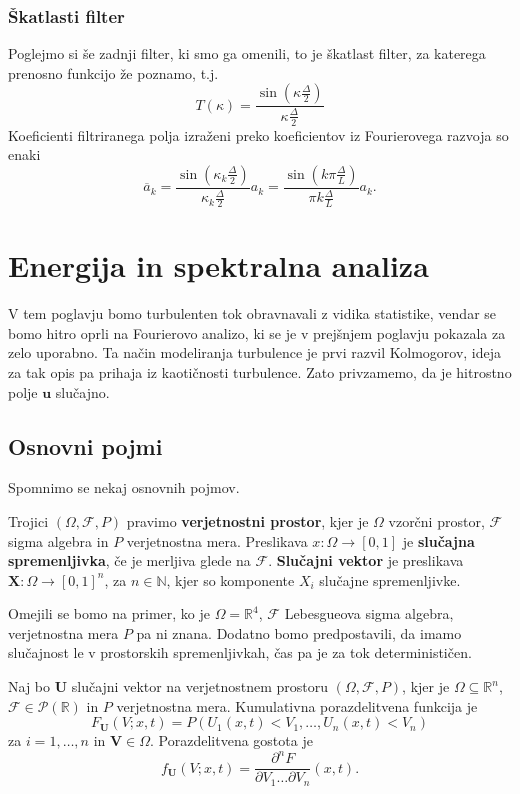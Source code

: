 \documentclass[mat2, tisk]{fmfdelo}
\newcommand{\R}{\mathbb R}
\newcommand{\N}{\mathbb N}
\newcommand{\bd}{\textbf}
\begin{document}
\subsubsection{Škatlasti filter}
Poglejmo si še zadnji filter, ki smo ga omenili, to je 
škatlast filter, za katerega prenosno funkcijo že poznamo, t.j.
$$
T(\kappa) = \frac{\sin(\kappa \frac{\Delta}{2})}{\kappa \frac{\Delta}{2}}
$$
Koeficienti filtriranega polja izraženi preko koeficientov iz Fourierovega razvoja so enaki
$$
\overline{a}_k = \frac{\sin(\kappa_k \frac{\Delta}{2})}{\kappa_k \frac{\Delta}{2}} a_k = \frac{\sin(k\pi\frac{\Delta}{L})}{\pi k\frac{\Delta}{L}} a_k .
$$


\section{Energija in spektralna analiza}

V tem poglavju bomo turbulenten tok obravnavali z vidika statistike, 
vendar se bomo hitro oprli na Fourierovo analizo, ki 
se je v prejšnjem poglavju pokazala za zelo uporabno. Ta način 
modeliranja turbulence je prvi razvil Kolmogorov, ideja za tak 
opis pa prihaja iz kaotičnosti turbulence. Zato privzamemo, 
da je hitrostno polje $\bd{u}$ slučajno. 

\subsection{Osnovni pojmi}

Spomnimo se nekaj osnovnih pojmov.

\begin{definicija}
Trojici $(\Omega, \mathcal{F}, P)$ pravimo \textbf{verjetnostni prostor}, 
kjer je $\Omega$ vzorčni prostor, $\mathcal{F}$ sigma algebra in 
$P$ verjetnostna mera. Preslikava $x: \Omega \rightarrow [0, 1]$ 
je \textbf{slučajna spremenljivka}, če je merljiva glede na $\mathcal{F}$. 
\textbf{Slučajni vektor} je preslikava $\bd{X}: \Omega \rightarrow [0, 1]^n$, 
za $n\in \N$, kjer so komponente $X_i$ slučajne spremenljivke.
\end{definicija}

Omejili  se bomo na primer, ko je $\Omega = \R^4$, $\mathcal{F}$ 
Lebesgueova sigma algebra, verjetnostna mera $P$ pa ni znana. 
Dodatno bomo predpostavili, da imamo slučajnost le v prostorskih 
spremenljivkah, čas pa je za tok determinističen. 

\begin{definicija}
Naj bo $\bd{U}$ slučajni vektor na verjetnostnem prostoru $(\Omega, \mathcal{F}, P)$,
kjer je $\Omega \subseteq \R^n$, $\mathcal{F} \in \mathcal{P}(\R)$ in $P$ verjetnostna mera.
Kumulativna porazdelitvena funkcija je
\begin{equation*}
F_\bd{U}({V}; x, t) = P(U_1(x, t) < V_1, \dots, U_n(x, t) < V_n)
\end{equation*}
za $i = 1, \dots, n$ in $\bd{V} \in \Omega$. Porazdelitvena 
gostota je 
\begin{equation*}
f_\bd{U}({V}; x, t) = \frac{\partial^n F}{\partial V_1 \dots \partial V_n}(x, t).
\end{equation*}
\end{definicija}
\end{document}

